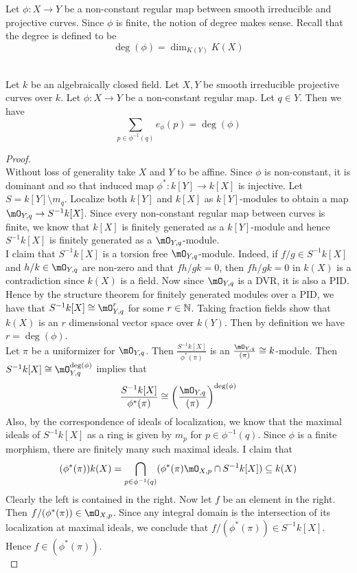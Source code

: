 \documentclass[a4paper]{article}
\begin{document}
Let $\phi:X\to Y$ be a non-constant regular map between smooth irreducible and projective curves. Since $\phi$ is finite, the notion of degree makes sense. Recall that the degree is defined to be $$\deg(\phi)=\dim_{K(Y)}K(X)$$

\begin{prp}{}{}\\
Let $k$ be an algebraically closed field. Let $X,Y$ be smooth irreducible projective curves over $k$. Let $\phi:X\to Y$ be a non-constant regular map. Let $q\in Y$. Then we have $$\sum_{p\in\phi^{-1}(q)}e_\phi(p)=\deg(\phi)$$
\begin{proof}\\
Without loss of generality take $X$ and $Y$ to be affine. Since $\phi$ is non-constant, it is dominant and so that induced map $\phi^\ast:k[Y]\to k[X]$ is injective. Let $S=k[Y]\setminus m_q$. Localize both $k[Y]$ and $k[X]$ as $k[Y]$-modules to obtain a map $\mO_{Y,q}\to S^{-1}k[X]$. Since every non-constant regular map between curves is finite, we know that $k[X]$ is finitely generated as a $k[Y]$-module and hence $S^{-1}k[X]$ is finitely generated as a $\mO_{Y,q}$-module. \\

I claim that $S^{-1}k[X]$ is a torsion free $\mO_{Y,q}$-module. Indeed, if $f/g\in S^{-1}k[X]$ and $h/k\in\mO_{Y,q}$ are non-zero and that $fh/gk=0$, then $fh/gk=0$ in $k(X)$ is a contradiction since $k(X)$ is a field. Now since $\mO_{Y,q}$ is a DVR, it is also a PID. Hence by the structure theorem for finitely generated modules over a PID, we have that $S^{-1}k[X]\cong\mO_{Y,q}^r$ for some $r\in\mathbb{N}$. Taking fraction fields show that $k(X)$ is an $r$ dimensional vector space over $k(Y)$. Then by definition we have $r=\deg(\phi)$. \\

Let $\pi$ be a uniformizer for $\mO_{Y,q}$. Then $\frac{S^{-1}k[X]}{\phi^\ast(\pi)}$ is an $\frac{\mO_{Y,q}}{(\pi)}\cong k$-module. Then $S^{-1}k[X]\cong\mO_{Y,q}^{\deg(\phi)}$ implies that $$\frac{S^{-1}k[X]}{\phi^\ast(\pi)}\cong\left(\frac{\mO_{Y,q}}{(\pi)}\right)^{\deg(\phi)}$$ Also, by the correspondence of ideals of localization, we know that the maximal ideals of $S^{-1}k[X]$ as a ring is given by $m_p$ for $p\in\phi^{-1}(q)$. Since $\phi$ is a finite morphism, there are finitely many such maximal ideals. I claim that $$(\phi^\ast(\pi))k(X)=\bigcap_{p\in\phi^{-1}(q)}(\phi^\ast(\pi)\mO_{X,p}\cap S^{-1}k[X])\subseteq k(X)$$ Clearly the left is contained in the right. Now let $f$ be an element in the right. Then $f/(\phi^\ast(\pi))\in\mO_{X,p}$. Since any integral domain is the intersection of its localization at maximal ideals, we conclude that $f/(\phi^\ast(\pi))\in S^{-1}k[X]$. Hence $f\in(\phi^\ast(\pi))$. \\


\end{proof}
\end{prp}
\end{document}

